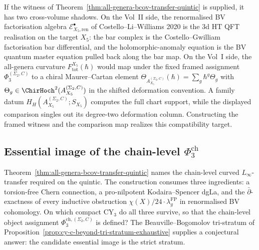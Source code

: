 \begin{remark}
\label{rem:cross-vol-bv-h}
If the witness of Theorem~\ref{thm:all-genera-bcov-transfer-quintic} is
supplied, it has two cross-volume shadows. On the Vol~II side, the
renormalised BV factorisation algebra
$\mathcal{E}^\bullet_{X_5, \mathrm{ren}}$ of Costello--Li--Williams
2020 is the $3$d HT QFT realisation on the target $X_5$: the bar
complex is the Costello--Gwilliam factorisation bar differential, and
the holomorphic-anomaly equation is the BV quantum master equation
pulled back along the bar map. On the Vol~I side, the all-genera
curvature $F_{\mathrm{tot}}^{X_5}(\hbar)$ would map under the fixed
framed assignment $\Phi_3^{(\Sigma_2,C)}$ to a chiral
Maurer--Cartan element
$\Theta_{A_{X_5}^{(\Sigma_2,C)}}(\hbar) = \sum_g \hbar^g \Theta_g$
with $\Theta_g \in \ChirHoch^2(A_{X_5}^{(\Sigma_2,C)})$ in the
shifted deformation convention.  A family datum
$H_H(A_{X_5}^{(\Sigma_2,C)};S_{X_5})$ computes the full chart
support, while the displayed comparison singles out its
degree-two deformation column.  Constructing the framed witness and
the comparison map realizes this compatibility target.
\end{remark}

\subsection{Essential image of the chain-level \texorpdfstring{$\Phi_3^{\mathrm{ch}}$}{Phi-3-()ch}}
\label{subsec:essential-image-phi3-ch}

Theorem~\ref{thm:all-genera-bcov-transfer-quintic} names the chain-level curved $L_\infty$-transfer required on the quintic. The construction consumes three ingredients: a torsion-free Chern connection, a pro-nilpotent Kodaira--Spencer dgLa, and the $\bar\partial$-exactness of every inductive obstruction $\chi(X)/24 \cdot \lambda_g^{\mathrm{FP}}$ in renormalised BV cohomology. On which compact CY$_3$ do all three survive, so that the chain-level object assignment $\Phi_3^{\mathrm{ch},(\Sigma_2,C)}$ is defined? The Beauville--Bogomolov tri-stratum of Proposition~\ref{prop:cy-c-beyond-tri-stratum-exhaustive} supplies a conjectural answer: the candidate essential image is the strict stratum.

